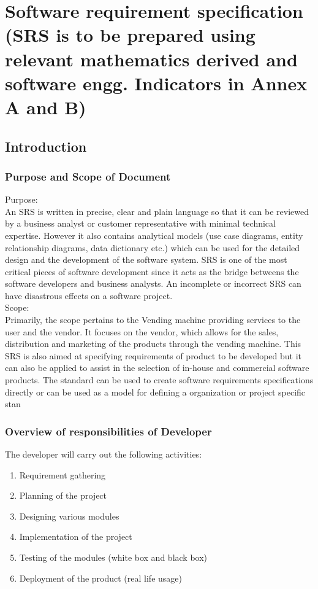 \documentclass[oneside,a4paper,12pt]{report}
\begin{document}
\chapter{Software requirement specification  (SRS is to be prepared using relevant mathematics derived and software engg. Indicators in Annex A and B)}

\section{Introduction}
\subsection{Purpose and Scope of Document}
Purpose:\\
An SRS is written in precise, clear and plain language so that it can be reviewed by a business
analyst or customer representative with minimal technical expertise. However it also contains
analytical models (use case diagrams, entity relationship diagrams, data dictionary etc.) which
can be used for the detailed design and the development of the software system. SRS is one of
the most critical pieces of software development since it acts as the bridge betweens the
software developers and business analysts. An incomplete or incorrect SRS can have
disastrous effects on a software project.\\
Scope:\\
Primarily, the scope pertains to the Vending machine providing services to the user and the
vendor. It focuses on the vendor, which allows for the sales, distribution and marketing of the
products through the vending machine.
This SRS is also aimed at specifying requirements of product to be developed but it can also be
applied to assist in the selection of in-house and commercial software products. The standard can
be used to create software requirements specifications directly or can be used as a model for
defining a organization or project specific stan\\
\subsection{Overview of responsibilities of Developer}
The developer will carry out the following activities:
\begin{enumerate}

\item Requirement gathering
\item Planning of the project
\item Designing various modules
\item Implementation of the project
\item Testing of the modules (white box and black box)
\item Deployment of the product (real life usage)

\end{enumerate}
\end{document}

